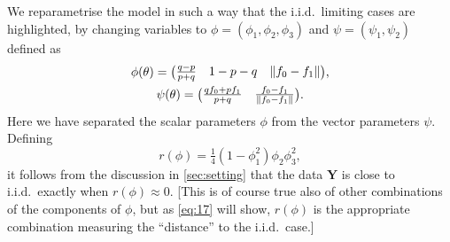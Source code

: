 \documentclass[journal]{IEEEtran}
\newcommand{\1}{\boldsymbol{1}}
\DeclarePairedDelimiter{\brackets}{(}{)}
\DeclarePairedDelimiter{\norm}{\lVert}{\rVert}
\begin{document}
	We reparametrise the model in such a way that the i.i.d.\ limiting cases are highlighted, by changing variables to $\phi=(\phi_1,\phi_2,\phi_3)$ and $\psi=(\psi_1,\psi_2)$ defined as
	\begin{gather*}
		\phi(\theta)%
		=%
		\brackets[\big]{\begin{matrix}
				\frac{q-p}{p+q}%
				&1 - p - q%
				&\norm{ f_{0} - f_{1}}
				\\
		\end{matrix}},
		\\
		\psi(\theta)%
		=%
		\brackets[\big]{\begin{matrix}
				\frac{q f_{0} + p f_{1}}{p + q}%
				&\frac{f_0-f_1}{\norm{ f_0-f_1 }}\\
		\end{matrix}}
		.
	\end{gather*}
	Here we have separated the scalar parameters $\phi$ from the vector parameters $\psi$. %
	Defining
	\begin{equation}
		\label{eqn:rphi}
		r(\phi)=\tfrac{1}{4} (1-\phi_1^2)\phi_2\phi_3^2,
	\end{equation}
	it follows from the discussion in \cref{sec:setting} that the data $\bm{Y}$ is close to i.i.d.\ exactly when $r(\phi)\approx 0$. [This is of course true also of other combinations of the components of $\phi$, but as \cref{eq:17} will show, $r(\phi)$ is the appropriate combination measuring the ``distance'' to the i.i.d.\ case.]
\end{document}
